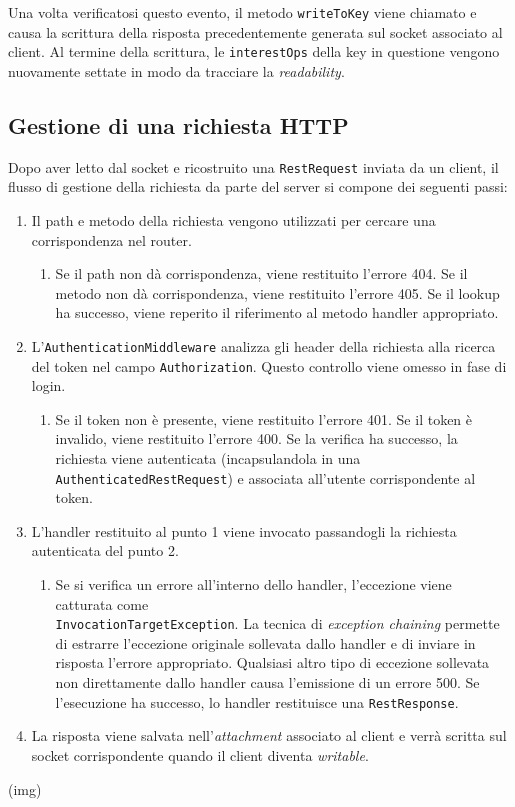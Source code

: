 \documentclass[a4paper,8pt]{article} %
\def\code#1{\texttt{#1}}
\begin{document}
\par Una volta verificatosi questo evento, il metodo \code{writeToKey} viene chiamato e causa la scrittura della risposta precedentemente generata sul socket associato al client. Al termine della scrittura, le \code{interestOps} della key in questione
vengono nuovamente settate in modo da tracciare la \emph{readability}.

\subsection{Gestione di una richiesta HTTP}
\label{sec:http_flow}

Dopo aver letto dal socket e ricostruito una \code{RestRequest} inviata da un client, il flusso di gestione della richiesta da parte del server si compone dei seguenti passi:
\begin{enumerate}
    \item Il path e metodo della richiesta vengono utilizzati per cercare una corrispondenza nel router.
          \begin{enumerate}
              \item Se il path non dà corrispondenza, viene restituito l'errore 404. Se il metodo non dà corrispondenza, viene restituito l'errore 405. Se il lookup ha successo, viene reperito il riferimento al metodo handler appropriato.
          \end{enumerate}
    \item L'\code{AuthenticationMiddleware} analizza gli header della richiesta alla ricerca del token nel campo \code{Authorization}. Questo controllo viene omesso in fase di login.
          \begin{enumerate}
              \item Se il token non è presente, viene restituito l'errore 401. Se il token è invalido, viene restituito l'errore 400. Se la verifica ha successo, la richiesta viene autenticata (incapsulandola in una \code{AuthenticatedRestRequest}) e associata all'utente corrispondente al token.
          \end{enumerate}
    \item L'handler restituito al punto 1 viene invocato passandogli la richiesta autenticata del punto 2.
          \begin{enumerate}
              \item Se si verifica un errore all'interno dello handler, l'eccezione viene catturata come\\ \code{InvocationTargetException}. La tecnica di \emph{exception chaining} permette di estrarre l'eccezione originale
                    sollevata dallo handler e di inviare in risposta l'errore appropriato. Qualsiasi altro tipo di eccezione sollevata non direttamente dallo handler causa l'emissione di un errore 500. Se l'esecuzione ha successo, lo handler restituisce una \code{RestResponse}.
          \end{enumerate}
    \item La risposta viene salvata nell'\emph{attachment} associato al client e verrà scritta sul socket corrispondente quando il client diventa \emph{writable}.
\end{enumerate}
(img)\\
\end{document}
